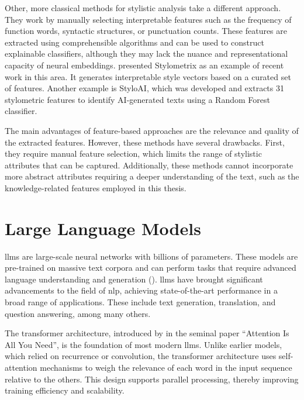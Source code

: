 Other, more classical methods for stylistic analysis take a different approach. They work by manually selecting interpretable features such as the frequency of function words, syntactic structures, or punctuation counts. These features are extracted using comprehensible algorithms and can be used to construct explainable classifiers, although they may lack the nuance and representational capacity of neural embeddings.
\citet{okulskaStyloMetrixOpensourceMultilingual2023} presented Stylometrix as an example of recent work in this area. It generates interpretable style vectors based on a curated set of features. Another example is StyloAI, which was developed \citet{oparaStyloAIDistinguishingAIgenerated2024a} and extracts 31 stylometric features to identify AI-generated texts using a Random Forest classifier.

The main advantages of feature-based approaches are the relevance and quality of the extracted features. However, these methods have several drawbacks. First, they require manual feature selection, which limits the range of stylistic attributes that can be captured. Additionally, these methods cannot incorporate more abstract attributes requiring a deeper understanding of the text, such as the knowledge-related features employed in this thesis.

\section{Large Language Models}
\label{sec:background:llm}

\Acfp{llm} are large-scale neural networks with billions of parameters. These models are pre-trained on massive text corpora and can perform tasks that require advanced language understanding and generation (\cite{minaeeLargeLanguageModels2025}).
\acp{llm} have brought significant advancements to the field of \acl{nlp}, achieving state-of-the-art performance in a broad range of applications. These include text generation, translation, and question answering, among many others.

The transformer architecture, introduced by \citet{NIPS2017_3f5ee243} in the seminal paper \enquote{Attention Is All You Need}, is the foundation of most modern \acp{llm}. Unlike earlier models, which relied on recurrence or convolution, the transformer architecture uses self-attention mechanisms to weigh the relevance of each word in the input sequence relative to the others. This design supports parallel processing, thereby improving training efficiency and scalability.


